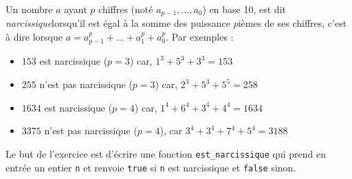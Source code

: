 \documentclass[11pt,a4paper]{article}
\begin{document}
\begin{Exercise}[title = {Nombres narcissiques}]
    
Un nombre $a$ ayant $p$ chiffres (noté $a_{p-1}, \dots, a_0$) en base 10, est dit \textit{narcissique}lorsqu'il est égal à la somme des puissance $p$ièmes de ses chiffres, c'est à dire lorsque $a = a_{p-1}^p + \dots + a_1^p + a_0^p$. Par exemples :
\begin{itemize}
\item[\textbullet] $153$ est narcissique ($p=3$) car, $1^3 + 5^3 + 3^3 = 153$
\item[\textbullet] $255$ n'est pas narcissique ($p=3$)  car, $2^3 + 5^3 + 5^5 = 258$
\item[\textbullet] $1634$ est narcissique ($p=4$) car, $1^4 + 6^4 + 3^4 + 4^4 = 1634$
\item[\textbullet] $3375$ n'est pas narcissique ($p=4$), car $3^4 + 3^4 + 7^4 + 5^4 = 3188$
\end{itemize}
Le but de l'exercice est d'écrire une fonction {\tt est\_narcissique} qui prend en entrée un entier {\tt n} et renvoie {\tt true} si {\tt n} est narcissique et {\tt false} sinon.
\subQuestion{}
\end{Exercise}
\end{document}
